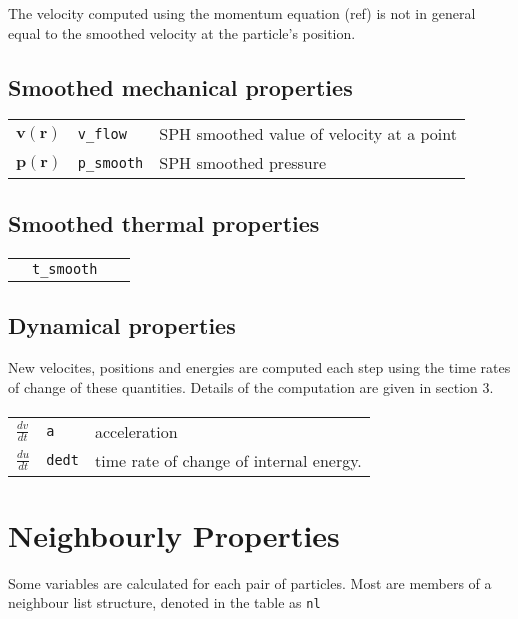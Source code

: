 The velocity computed using the momentum equation (ref) is not in general equal to the 
smoothed velocity at the particle's position.

\subsection{Smoothed mechanical properties}
\begin{tabularx}{\textwidth}{lll} \toprule
$\mathbold{v(r)}$ & \texttt{v\_flow } & SPH smoothed value of velocity at a point \\
$\mathbold{p(r)}$& \texttt{p\_smooth} & SPH smoothed pressure\\
\end{tabularx}

\subsection{Smoothed thermal properties}
\paragraph{}
\begin{tabularx}{\textwidth}{lll} \toprule
& \texttt{t\_smooth } &  \\
\end{tabularx}

\subsection{Dynamical properties}
New velocites, positions and energies are computed each step using the time
rates of change of these quantities.  Details of the computation are given in
section 3.

\paragraph{}
\begin{tabularx}{\textwidth}{lll} \toprule
$\frac{ dv}{dt}$ & \texttt{a} &  acceleration  \\
$\frac{ du}{dt} $& \texttt{dedt} & time rate of change of internal energy. \\
\end{tabularx}

\section{Neighbourly Properties}
Some variables are calculated for each pair of particles. Most are members of
a neighbour list structure, denoted in the table as \texttt{nl}

